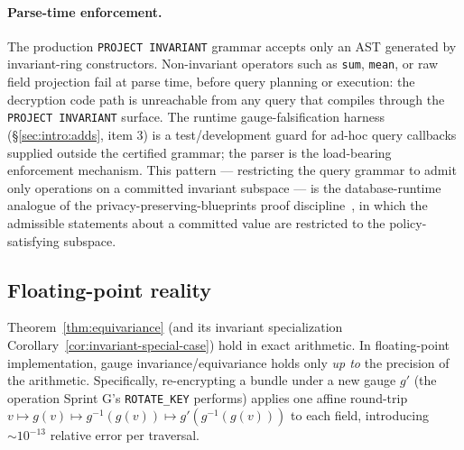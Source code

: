 \documentclass[11pt,letterpaper]{article}
\begin{document}
\paragraph{Parse-time enforcement.}
The production \verb|PROJECT INVARIANT| grammar accepts only an
AST generated by invariant-ring constructors. Non-invariant
operators such as \verb|sum|, \verb|mean|, or raw field projection
fail at parse time, before query planning or execution: the
decryption code path is unreachable from any query that compiles
through the \verb|PROJECT INVARIANT| surface. The runtime
gauge-falsification harness (\S\ref{sec:intro:adds}, item 3) is a
test/development guard for ad-hoc query callbacks supplied outside
the certified grammar; the parser is the load-bearing enforcement
mechanism. This pattern --- restricting the query grammar to admit
only operations on a committed invariant subspace --- is the
database-runtime analogue of the privacy-preserving-blueprints
proof discipline~\cite{kohlweiss2023blueprints}, in which the
admissible statements about a committed value are restricted to
the policy-satisfying subspace.

\subsection{Floating-point reality}
\label{sec:gauge-invariance:fp}

Theorem~\ref{thm:equivariance} (and its invariant
specialization Corollary~\ref{cor:invariant-special-case}) hold in
exact arithmetic. In floating-point implementation, gauge
invariance/equivariance holds only \emph{up to} the precision of
the arithmetic. Specifically, re-encrypting a
bundle under a new gauge $g'$ (the operation Sprint G's
\verb|ROTATE_KEY| performs) applies one affine round-trip
$v \mapsto g(v) \mapsto g^{-1}(g(v)) \mapsto g'(g^{-1}(g(v)))$ to each
field, introducing $\sim 10^{-13}$ relative error per traversal.
\end{document}
